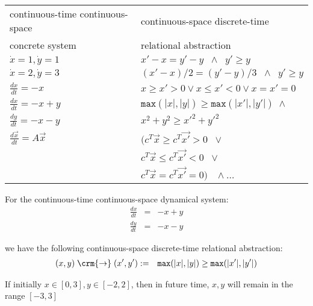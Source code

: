 \documentclass{seminar}
\begin{document}
\begin{slide}

\begin{tabular}{l|l}
\hline
continuous-time continuous-space 
& 
continuous-space discrete-time 
\\
concrete system & relational abstraction
\\ \hline \hline
$\dot{x} = 1, \dot{y} = 1$
&
$x'-x = y'-y \;\;\wedge\;\; y' \geq y$
\\
\hline
$\dot{x} = 2, \dot{y} = 3$
&
$(x'-x)/2 = (y'-y)/3 \;\;\wedge\;\; y' \geq y$
\\ \hline
$\frac{dx}{dt}  =  -x$
&  $x \geq x' > 0 \vee x\leq x' < 0\vee x=x'=0$
\\ \hline
 $\frac{dx}{dt}  =  -x + y$
& 
   $\mathtt{max}(|x|,|y|) \geq \mathtt{max}(|x'|,|y'|) \;\wedge\;$
\\
 $\frac{dy}{dt}  =  -x - y$
& 
   $x^2 + y^2 \geq {x'}^2 + {y'}^2$
\\ \hline
 $\frac{d\vec{x}}{dt}  =  A\vec{x}$
&
 $(c^T\vec{x} \geq c^T\vec{x'} > 0 \;\;\vee$
\\ & 
 $c^T\vec{x} \leq c^T\vec{x'} < 0 \;\;\vee$
\\ &
 $c^T\vec{x} = c^T\vec{x'} = 0) \;\;\;\wedge \ldots $
\\ \hline
\end{tabular}

\end{slide}
\begin{slide}

For the continuous-time continuous-space dynamical system:
\begin{eqnarray*}
 \frac{dx}{dt} & = & -x + y
\\
 \frac{dy}{dt} & = & -x - y
\end{eqnarray*}

we have the following continuous-space discrete-time relational abstraction:
\begin{eqnarray*}
(x,y) \;{\crm{\rightarrow}}\; (x',y')  & := &
   \mathtt{max}(|x|,|y|) \geq 
   \mathtt{max}(|x'|,|y'|)
\end{eqnarray*}

If initially $x \in [0,3], y \in [-2,2]$, then in {} future time,
$x,y$ will remain in the range $[-3,3]$


\end{slide}
\end{document}
